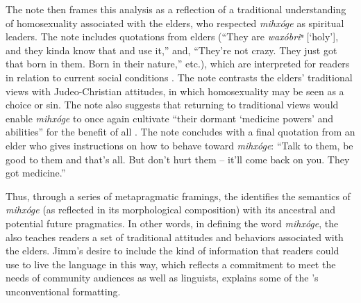 \documentclass[output=paper]{LSP/langsci}
\begin{document}
The note then frames this analysis as a reflection of a traditional understanding of homosexuality associated with the elders, who respected \emph{mihxóge} as spiritual leaders. The note includes quotations from elders (``They are \emph{waxóbriⁿ} [`holy'], and they kinda know that and use it,'' and, ``They're not crazy. They just got that born in them. Born in their nature,'' etc.), which are interpreted for readers in relation to current social conditions \citep[7]{Goodtracks2008}. The note contrasts the elders' traditional views with Judeo-Christian attitudes, in which homosexuality may be seen as a choice or sin. The note also suggests that returning to traditional views would enable \emph{mihxóge} to once again cultivate ``their dormant `medicine powers' and abilities'' for the benefit of all \citep[7]{Goodtracks2008}. The note concludes with a final quotation from an elder who gives instructions on how to behave toward \emph{mihxóge}: ``Talk to them, be good to them and that's all. But don't hurt them -- it'll come back on you. They got medicine.'' \citep[7]{Goodtracks2008}

Thus, through a series of metapragmatic framings, the  identifies the semantics of \emph{mihxóge} (as reflected in its morphological composition) with its ancestral and potential future pragmatics. In other words, in defining the word \emph{mihxóge}, the  also teaches readers a set of traditional attitudes and behaviors associated with the elders. Jimm's desire to include the kind of information that readers could use to live the language in this way, which reflects a commitment to meet the needs of community audiences as well as linguists, explains some of the 's unconventional formatting.
\end{document}
